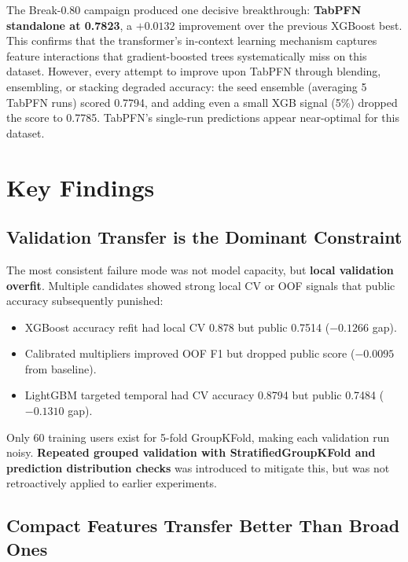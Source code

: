 \documentclass[12pt, a4paper]{article}
\begin{document}
The Break-0.80 campaign produced one decisive breakthrough: \textbf{TabPFN standalone at 0.7823}, a $+0.0132$ improvement over the previous XGBoost best. This confirms that the transformer's in-context learning mechanism captures feature interactions that gradient-boosted trees systematically miss on this dataset. However, every attempt to improve upon TabPFN through blending, ensembling, or stacking degraded accuracy: the seed ensemble (averaging 5 TabPFN runs) scored 0.7794, and adding even a small XGB signal (5\%) dropped the score to 0.7785. TabPFN's single-run predictions appear near-optimal for this dataset.

\section{Key Findings}

\subsection{Validation Transfer is the Dominant Constraint}

The most consistent failure mode was not model capacity, but \textbf{local validation overfit}. Multiple candidates showed strong local CV or OOF signals that public accuracy subsequently punished:

\begin{itemize}
    \item XGBoost accuracy refit had local CV 0.878 but public 0.7514 ($-0.1266$ gap).
    \item Calibrated multipliers improved OOF F1 but dropped public score ($-0.0095$ from baseline).
    \item LightGBM targeted temporal had CV accuracy 0.8794 but public 0.7484 ($-0.1310$ gap).
\end{itemize}

Only 60 training users exist for 5-fold GroupKFold, making each validation run noisy. \textbf{Repeated grouped validation with StratifiedGroupKFold and prediction distribution checks} was introduced to mitigate this, but was not retroactively applied to earlier experiments.

\subsection{Compact Features Transfer Better Than Broad Ones}
\end{document}

